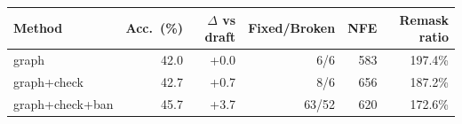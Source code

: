 \begin{tabular}{lrrrrr}
\toprule
Method & Acc.\ (\%) & $\Delta$ vs draft & Fixed/Broken & NFE & Remask ratio \\
\midrule
graph & 42.0 & +0.0 & 6/6 & 583 & 197.4\% \\
graph+check & 42.7 & +0.7 & 8/6 & 656 & 187.2\% \\
graph+check+ban & 45.7 & +3.7 & 63/52 & 620 & 172.6\% \\
\bottomrule
\end{tabular}

